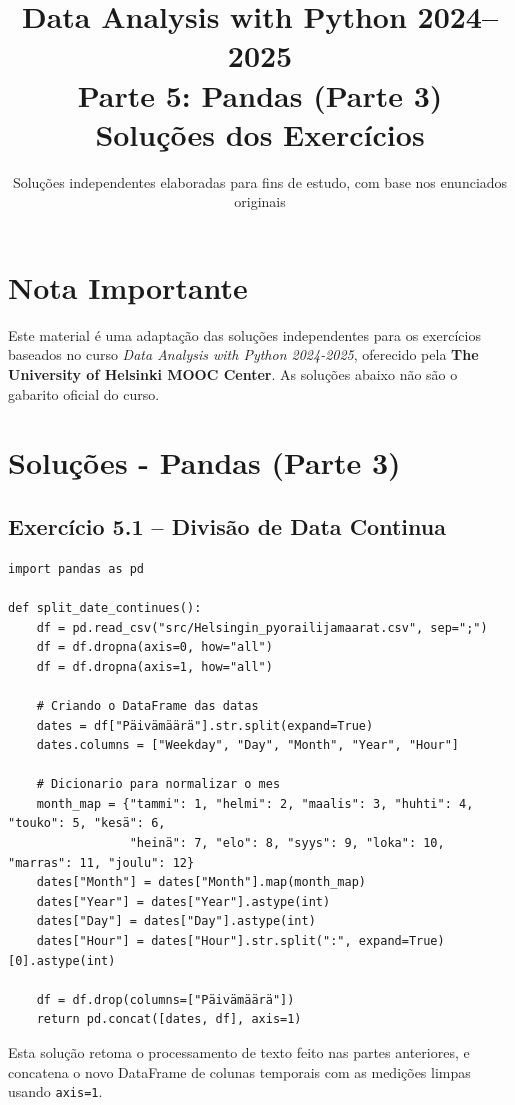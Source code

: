 \documentclass[11pt,a4paper]{article}
\title{\textbf{Data Analysis with Python 2024--2025}\\Parte 5: Pandas (Parte 3)\\\large Soluções dos Exercícios}
\author{Soluções independentes elaboradas para fins de estudo, com base nos enunciados originais}
\date{}
\begin{document}
\maketitle

\section*{Nota Importante}
Este material é uma adaptação das soluções independentes para os exercícios baseados no curso \textit{Data Analysis with Python 2024-2025}, oferecido pela \textbf{The University of Helsinki MOOC Center}. As soluções abaixo não são o gabarito oficial do curso.

\tableofcontents
\newpage

\section{Soluções - Pandas (Parte 3)}

\subsection*{Exercício 5.1 -- Divisão de Data Continua}
\begin{solucao}
\begin{lstlisting}
import pandas as pd

def split_date_continues():
    df = pd.read_csv("src/Helsingin_pyorailijamaarat.csv", sep=";")
    df = df.dropna(axis=0, how="all")
    df = df.dropna(axis=1, how="all")
    
    # Criando o DataFrame das datas
    dates = df["Päivämäärä"].str.split(expand=True)
    dates.columns = ["Weekday", "Day", "Month", "Year", "Hour"]
    
    # Dicionario para normalizar o mes
    month_map = {"tammi": 1, "helmi": 2, "maalis": 3, "huhti": 4, "touko": 5, "kesä": 6, 
                 "heinä": 7, "elo": 8, "syys": 9, "loka": 10, "marras": 11, "joulu": 12}
    dates["Month"] = dates["Month"].map(month_map)
    dates["Year"] = dates["Year"].astype(int)
    dates["Day"] = dates["Day"].astype(int)
    dates["Hour"] = dates["Hour"].str.split(":", expand=True)[0].astype(int)
    
    df = df.drop(columns=["Päivämäärä"])
    return pd.concat([dates, df], axis=1)
\end{lstlisting}
Esta solução retoma o processamento de texto feito nas partes anteriores, e concatena o novo DataFrame de colunas temporais com as medições limpas usando \texttt{axis=1}.
\end{solucao}
\end{document}
